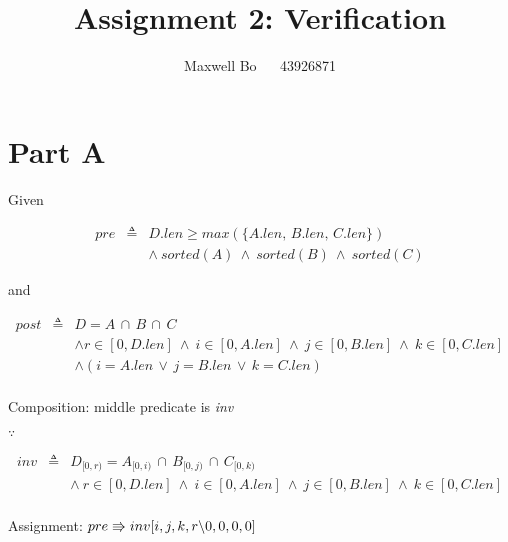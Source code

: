 \documentclass{article}
\title{\bf Assignment 2: Verification}
\author{Maxwell Bo ~~ 43926871}
\begin{document}
\maketitle

\section{Part A}

Given

\begin{eqnarray*}
pre & \triangleq & D.len \geqslant max(\{A.len,\, B.len,\, C.len\})\\
    && \land~ sorted(A) ~\land~ sorted(B) ~\land~ sorted(C)
\end{eqnarray*}

and

\begin{eqnarray*}
post & \triangleq & D = A\, \cap\, B\, \cap\, C\\
     && \land r \in [0, D.len] ~\land~ i \in [0, A.len] ~\land~ j \in [0, B.len] ~\land~ k \in [0, C.len]\\
     && \land (i = A.len\, \lor\, j = B.len\, \lor\, k = C.len)\\
\end{eqnarray*}


\DERIVE
{}
 {Composition: middle predicate is \textit{inv}}
\ENDDERIVE

$\because$

\begin{eqnarray*}
inv & \triangleq & D_{[0, r)} = A_{[0, i)}\, \cap\, B_{[0, j)}\, \cap\, C_{[0, k)}\\
     && \land~ r \in [0, D.len] ~\land~ i \in [0, A.len] ~\land~ j \in [0, B.len] ~\land~ k \in [0, C.len]\\
\end{eqnarray*}

\DERIVE
{} {Assignment: $pre \Rrightarrow inv[i, j, k, r\backslash 0, 0, 0, 0]$}
\ENDDERIVE
\end{document}
